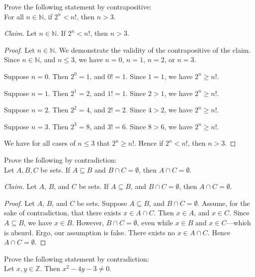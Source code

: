 \documentclass{article}
\newcommand{\Z}{\mathbb{Z}}
\theoremstyle{definition}
\begin{document}
\begin{question}
    Prove the following statement by contrapositive: \\
    For all $n\in \mathbb{N}$, if $2^n<n!$, then $n>3$.
\end{question}
\begin{solution}
\newline

\noindent\textit{Claim. }Let $n\in\mathbb{N}$. If $2^n<n!$, then $n>3$.
\begin{proof}
Let $n\in\mathbb{N}$. We demonstrate the validity of the contrapositive of the claim. Since $n\in\mathbb{N}$, and $n\leq 3$, we have $n=0$, $n=1$, $n=2$, or $n=3$.

Suppose $n=0$. Then $2^0=1$, and $0!=1$. Since $1=1$, we have $2^n\geq n!$.

Suppose $n=1$. Then $2^1=2$, and $1!=1$. Since $2>1$, we have $2^n\geq n!$.

Suppose $n=2$. Then $2^2=4$, and $2!=2$. Since $4>2$, we have $2^n\geq n!$.

Suppose $n=3$. Then $2^3=8$, and $3!=6$. Since $8>6$, we have $2^n\geq n!$.

\noindent We have for all cases of $n\leq 3$ that $2^n\geq n!$. Hence if $2^n<n!$, then $n>3$.
\end{proof}
\end{solution}
\begin{question}
    Prove the following by contradiction:\\
    Let $A, B, C$ be sets. If $A\subseteq B$ and $B\cap C=\emptyset$, then $A\cap C=\emptyset$.
\end{question}
\begin{solution}
\newline

\noindent\textit{Claim. }Let $A$, $B$, and $C$ be sets. If $A\subseteq B$, and $B\cap C=\emptyset$, then $A\cap C=\emptyset$.
\begin{proof}
Let $A$, $B$, and $C$ be sets. Suppose $A\subseteq B$, and $B\cap C=\emptyset$. Assume, for the sake of contradiction, that there exists $x\in A\cap C$. Then $x\in A$, and $x\in C$. Since $A\subseteq B$, we have $x\in B$. However, $B\cap C=\emptyset$, even while $x\in B$ and $x\in C$---which is absurd. Ergo, our assumption is false. There exists no $x\in A\cap C$. Hence $A\cap C=\emptyset$.
\end{proof}
\end{solution}
\begin{question}
    Prove the following statement by contradiction:\\
    Let $x, y\in \Z$. Then $x^2-4y-3\neq 0$.
\end{question}
\end{document}
